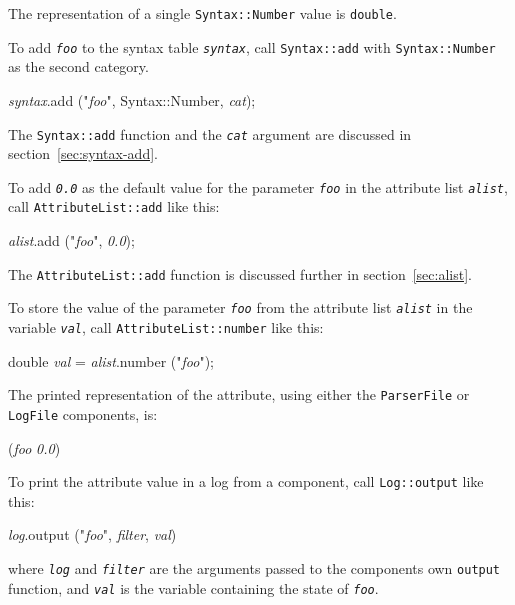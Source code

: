 \documentclass{article}
\newcommand{\cplusplus}%
{{\leavevmode{\rm{\hbox{C\hskip -0.1ex\raise 0.5ex\hbox{\tiny ++}}}}}}
\newcommand{\code}[1]{\texttt{#1}}
\begin{document}
The \cplusplus{} representation of a single \code{Syntax::Number}
value is \code{double}.

To add \texttt{\textit{foo}} to the syntax table
\texttt{\textit{syntax}}, call \code{Syntax::add} with
\code{Syntax::Number} as the second category.
\begin{center}
  \begin{tt}
    \textit{syntax}.add ("\textit{foo}", Syntax::Number, \textit{cat});
  \end{tt}
\end{center}
The \code{Syntax::add} function and the \texttt{\textit{cat}}
argument are discussed in section~\ref{sec:syntax-add}.

To add \texttt{\textit{0.0}} as the default value for the parameter
\texttt{\textit{foo}} in the attribute list \texttt{\textit{alist}},
call \code{AttributeList::add} like this:
\begin{center}
  \begin{tt}
    \textit{alist}.add ("\textit{foo}", \textit{0.0});
  \end{tt}
\end{center}
The \code{AttributeList::add} function is 
discussed further in section~\ref{sec:alist}.

To store the value of the parameter \texttt{\textit{foo}} from the
attribute list \texttt{\textit{alist}} in the variable
\texttt{\textit{val}}, call \code{AttributeList::number} like this:
\begin{center}
  \begin{tt}
    double \textit{val} = \textit{alist}.number ("\textit{foo}");
  \end{tt}
\end{center}

The printed representation of the attribute, using either the 
\code{ParserFile} or \code{LogFile} components, is:
\begin{center}
  \begin{tt}
    (\textit{foo} \textit{0.0})
  \end{tt}
\end{center}

To print the attribute value in a log from a component, call
\code{Log::output} like this:
\begin{center}
  \begin{tt}
    \textit{log}.output ("\textit{foo}", \textit{filter}, \textit{val})
  \end{tt}
\end{center}
where \texttt{\textit{log}} and \texttt{\textit{filter}} are the
arguments passed to the components own \code{output} function, and
\texttt{\textit{val}} is the variable containing the state of
\texttt{\textit{foo}}.
\end{document}
